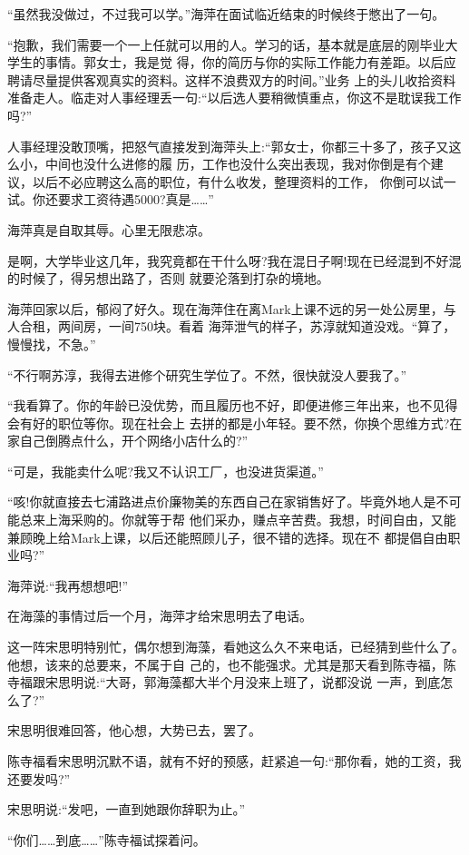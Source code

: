 \documentclass[11pt,a4paper,onecolumn]{article}
\begin{document}
``虽然我没做过，不过我可以学。''海萍在面试临近结束的时候终于憋出了一句。

``抱歉，我们需要一个一上任就可以用的人。学习的话，基本就是底层的刚毕业大学生的事情。郭女士，我是觉
得，你的简历与你的实际工作能力有差距。以后应聘请尽量提供客观真实的资料。这样不浪费双方的时间。''业务
上的头儿收拾资料准备走人。临走对人事经理丢一句:``以后选人要稍微慎重点，你这不是耽误我工作吗?''

人事经理没敢顶嘴，把怒气直接发到海萍头上:``郭女士，你都三十多了，孩子又这么小，中间也没什么进修的履
历，工作也没什么突出表现，我对你倒是有个建议，以后不必应聘这么高的职位，有什么收发，整理资料的工作，
你倒可以试一试。你还要求工资待遇5000?真是……''

海萍真是自取其辱。心里无限悲凉。

是啊，大学毕业这几年，我究竟都在干什么呀?我在混日子啊!现在已经混到不好混的时候了，得另想出路了，否则
就要沦落到打杂的境地。

海萍回家以后，郁闷了好久。现在海萍住在离Mark上课不远的另一处公房里，与人合租，两间房，一间750块。看着
海萍泄气的样子，苏淳就知道没戏。``算了，慢慢找，不急。''

``不行啊苏淳，我得去进修个研究生学位了。不然，很快就没人要我了。''

``我看算了。你的年龄已没优势，而且履历也不好，即便进修三年出来，也不见得会有好的职位等你。现在社会上
去拼的都是小年轻。要不然，你换个思维方式?在家自己倒腾点什么，开个网络小店什么的?''

``可是，我能卖什么呢?我又不认识工厂，也没进货渠道。''

``咳!你就直接去七浦路进点价廉物美的东西自己在家销售好了。毕竟外地人是不可能总来上海采购的。你就等于帮
他们采办，赚点辛苦费。我想，时间自由，又能兼顾晚上给Mark上课，以后还能照顾儿子，很不错的选择。现在不
都提倡自由职业吗?''

海萍说:``我再想想吧!''

在海藻的事情过后一个月，海萍才给宋思明去了电话。

这一阵宋思明特别忙，偶尔想到海藻，看她这么久不来电话，已经猜到些什么了。他想，该来的总要来，不属于自
己的，也不能强求。尤其是那天看到陈寺福，陈寺福跟宋思明说:``大哥，郭海藻都大半个月没来上班了，说都没说
一声，到底怎么了?''

宋思明很难回答，他心想，大势已去，罢了。

陈寺福看宋思明沉默不语，就有不好的预感，赶紧追一句:``那你看，她的工资，我还要发吗?''

宋思明说:``发吧，一直到她跟你辞职为止。''

``你们……到底……''陈寺福试探着问。
\end{document}
